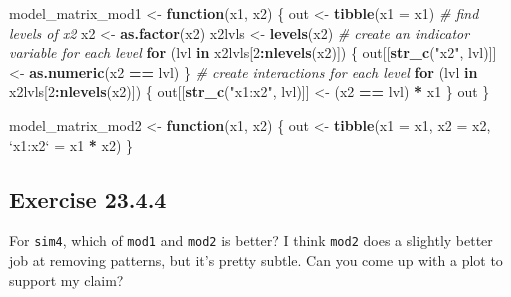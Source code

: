 \documentclass[]{book}
\newenvironment{Shaded}{\begin{snugshade}}{\end{snugshade}}
\newcommand{\CommentTok}[1]{\textcolor[rgb]{0.56,0.35,0.01}{\textit{#1}}}
\newcommand{\ControlFlowTok}[1]{\textcolor[rgb]{0.13,0.29,0.53}{\textbf{#1}}}
\newcommand{\DataTypeTok}[1]{\textcolor[rgb]{0.13,0.29,0.53}{#1}}
\newcommand{\DecValTok}[1]{\textcolor[rgb]{0.00,0.00,0.81}{#1}}
\newcommand{\KeywordTok}[1]{\textcolor[rgb]{0.13,0.29,0.53}{\textbf{#1}}}
\newcommand{\NormalTok}[1]{#1}
\newcommand{\OperatorTok}[1]{\textcolor[rgb]{0.81,0.36,0.00}{\textbf{#1}}}
\newcommand{\StringTok}[1]{\textcolor[rgb]{0.31,0.60,0.02}{#1}}
\theoremstyle{plain}
\theoremstyle{remark}
\theoremstyle{definition}
\theoremstyle{definition}
\theoremstyle{definition}
\theoremstyle{remark}
\begin{document}
\begin{Shaded}
\begin{Highlighting}[]
\NormalTok{model_matrix_mod1 <-}\StringTok{ }\ControlFlowTok{function}\NormalTok{(x1, x2) \{}
\NormalTok{  out <-}\StringTok{ }\KeywordTok{tibble}\NormalTok{(}\DataTypeTok{x1 =}\NormalTok{ x1)  }
  \CommentTok{# find levels of x2}
\NormalTok{  x2 <-}\StringTok{ }\KeywordTok{as.factor}\NormalTok{(x2)}
\NormalTok{  x2lvls <-}\StringTok{ }\KeywordTok{levels}\NormalTok{(x2)}
  \CommentTok{# create an indicator variable for each level}
  \ControlFlowTok{for}\NormalTok{ (lvl }\ControlFlowTok{in}\NormalTok{ x2lvls[}\DecValTok{2}\OperatorTok{:}\KeywordTok{nlevels}\NormalTok{(x2)]) \{}
\NormalTok{    out[[}\KeywordTok{str_c}\NormalTok{(}\StringTok{"x2"}\NormalTok{, lvl)]] <-}\StringTok{ }\KeywordTok{as.numeric}\NormalTok{(x2 }\OperatorTok{==}\StringTok{ }\NormalTok{lvl)}
\NormalTok{  \}}
  \CommentTok{# create interactions for each level}
  \ControlFlowTok{for}\NormalTok{ (lvl }\ControlFlowTok{in}\NormalTok{ x2lvls[}\DecValTok{2}\OperatorTok{:}\KeywordTok{nlevels}\NormalTok{(x2)]) \{}
\NormalTok{    out[[}\KeywordTok{str_c}\NormalTok{(}\StringTok{"x1:x2"}\NormalTok{, lvl)]] <-}\StringTok{ }\NormalTok{(x2 }\OperatorTok{==}\StringTok{ }\NormalTok{lvl) }\OperatorTok{*}\StringTok{ }\NormalTok{x1}
\NormalTok{  \}}
\NormalTok{  out}
\NormalTok{\}}
\end{Highlighting}
\end{Shaded}

\begin{Shaded}
\begin{Highlighting}[]
\NormalTok{model_matrix_mod2 <-}\StringTok{ }\ControlFlowTok{function}\NormalTok{(x1, x2) \{}
\NormalTok{  out <-}\StringTok{ }\KeywordTok{tibble}\NormalTok{(}\DataTypeTok{x1 =}\NormalTok{ x1,}
                \DataTypeTok{x2 =}\NormalTok{ x2,}
                \StringTok{`}\DataTypeTok{x1:x2}\StringTok{`}\NormalTok{ =}\StringTok{ }\NormalTok{x1 }\OperatorTok{*}\StringTok{ }\NormalTok{x2)}
\NormalTok{\}}
\end{Highlighting}
\end{Shaded}

\hypertarget{exercise-23.4.4}{%
\subsection*{\texorpdfstring{Exercise
{23.4.4}}{Exercise 23.4.4}}\label{exercise-23.4.4}}

For \texttt{sim4}, which of \texttt{mod1} and \texttt{mod2} is better? I
think \texttt{mod2} does a slightly better job at removing patterns, but
it's pretty subtle. Can you come up with a plot to support my claim?
\end{document}
